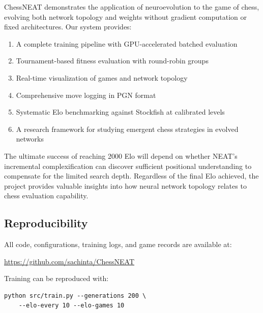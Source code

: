 \documentclass[11pt, twocolumn]{article}
\begin{document}
ChessNEAT demonstrates the application of neuroevolution to the game of chess, evolving both network topology and weights without gradient computation or fixed architectures. Our system provides:

\begin{enumerate}[leftmargin=*, itemsep=2pt]
    \item A complete training pipeline with GPU-accelerated batched evaluation
    \item Tournament-based fitness evaluation with round-robin groups
    \item Real-time visualization of games and network topology
    \item Comprehensive move logging in PGN format
    \item Systematic Elo benchmarking against Stockfish at calibrated levels
    \item A research framework for studying emergent chess strategies in evolved networks
\end{enumerate}

The ultimate success of reaching 2000 Elo will depend on whether NEAT's incremental complexification can discover sufficient positional understanding to compensate for the limited search depth. Regardless of the final Elo achieved, the project provides valuable insights into how neural network topology relates to chess evaluation capability.

\subsection*{Reproducibility}
All code, configurations, training logs, and game records are available at:
\begin{center}
    \url{https://github.com/sachinta/ChessNEAT}
\end{center}

Training can be reproduced with:
\begin{verbatim}
python src/train.py --generations 200 \
    --elo-every 10 --elo-games 10
\end{verbatim}


\end{document}
